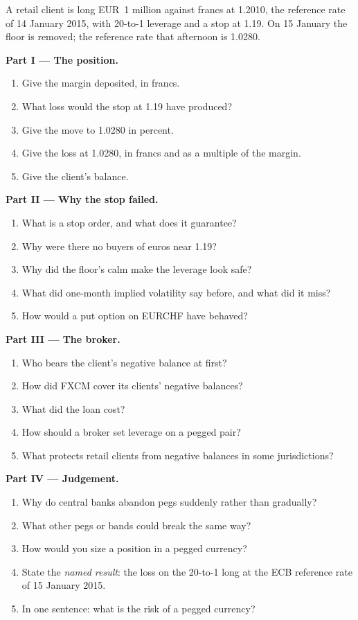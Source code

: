 \begin{problem}\label{pb:m2:emerging-market-fx-and-ndfs:1}
A retail client is long EUR~1 million against francs at 1.2010, the reference rate
of 14 January 2015, with 20-to-1 leverage and a stop at 1.19. On 15 January the
floor is removed; the reference rate that afternoon is 1.0280.

\medskip\noindent\textbf{Part I --- The position.}
\begin{enumerate}
\item Give the margin deposited, in francs.
\item What loss would the stop at 1.19 have produced?
\item Give the move to 1.0280 in percent.
\item Give the loss at 1.0280, in francs and as a multiple of the margin.
\item Give the client's balance.
\end{enumerate}

\medskip\noindent\textbf{Part II --- Why the stop failed.}
\begin{enumerate}[resume]
\item What is a stop order, and what does it guarantee?
\item Why were there no buyers of euros near 1.19?
\item Why did the floor's calm make the leverage look safe?
\item What did one-month implied volatility say before, and what did it miss?
\item How would a put option on EURCHF have behaved?
\end{enumerate}

\medskip\noindent\textbf{Part III --- The broker.}
\begin{enumerate}[resume]
\item Who bears the client's negative balance at first?
\item How did FXCM cover its clients' negative balances?
\item What did the loan cost?
\item How should a broker set leverage on a pegged pair?
\item What protects retail clients from negative balances in some jurisdictions?
\end{enumerate}

\medskip\noindent\textbf{Part IV --- Judgement.}
\begin{enumerate}[resume]
\item Why do central banks abandon pegs suddenly rather than gradually?
\item What other pegs or bands could break the same way?
\item How would you size a position in a pegged currency?
\item State the \emph{named result}: the loss on the 20-to-1 long at the ECB
reference rate of 15 January 2015.
\item In one sentence: what is the risk of a pegged currency?
\end{enumerate}
\end{problem}

